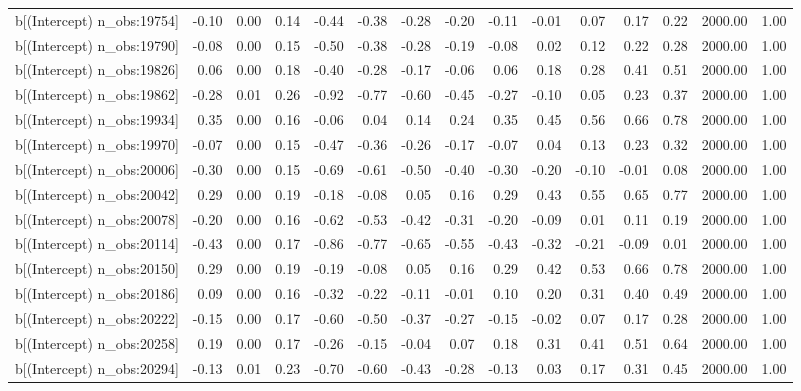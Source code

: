 \begin{table}[ht]
\begin{tabular}{rrrrrrrrrrrrrrr}
  b[(Intercept) n\_obs:19754] & -0.10 & 0.00 & 0.14 & -0.44 & -0.38 & -0.28 & -0.20 & -0.11 & -0.01 & 0.07 & 0.17 & 0.22 & 2000.00 & 1.00 \\ 
  b[(Intercept) n\_obs:19790] & -0.08 & 0.00 & 0.15 & -0.50 & -0.38 & -0.28 & -0.19 & -0.08 & 0.02 & 0.12 & 0.22 & 0.28 & 2000.00 & 1.00 \\ 
  b[(Intercept) n\_obs:19826] & 0.06 & 0.00 & 0.18 & -0.40 & -0.28 & -0.17 & -0.06 & 0.06 & 0.18 & 0.28 & 0.41 & 0.51 & 2000.00 & 1.00 \\ 
  b[(Intercept) n\_obs:19862] & -0.28 & 0.01 & 0.26 & -0.92 & -0.77 & -0.60 & -0.45 & -0.27 & -0.10 & 0.05 & 0.23 & 0.37 & 2000.00 & 1.00 \\ 
  b[(Intercept) n\_obs:19934] & 0.35 & 0.00 & 0.16 & -0.06 & 0.04 & 0.14 & 0.24 & 0.35 & 0.45 & 0.56 & 0.66 & 0.78 & 2000.00 & 1.00 \\ 
  b[(Intercept) n\_obs:19970] & -0.07 & 0.00 & 0.15 & -0.47 & -0.36 & -0.26 & -0.17 & -0.07 & 0.04 & 0.13 & 0.23 & 0.32 & 2000.00 & 1.00 \\ 
  b[(Intercept) n\_obs:20006] & -0.30 & 0.00 & 0.15 & -0.69 & -0.61 & -0.50 & -0.40 & -0.30 & -0.20 & -0.10 & -0.01 & 0.08 & 2000.00 & 1.00 \\ 
  b[(Intercept) n\_obs:20042] & 0.29 & 0.00 & 0.19 & -0.18 & -0.08 & 0.05 & 0.16 & 0.29 & 0.43 & 0.55 & 0.65 & 0.77 & 2000.00 & 1.00 \\ 
  b[(Intercept) n\_obs:20078] & -0.20 & 0.00 & 0.16 & -0.62 & -0.53 & -0.42 & -0.31 & -0.20 & -0.09 & 0.01 & 0.11 & 0.19 & 2000.00 & 1.00 \\ 
  b[(Intercept) n\_obs:20114] & -0.43 & 0.00 & 0.17 & -0.86 & -0.77 & -0.65 & -0.55 & -0.43 & -0.32 & -0.21 & -0.09 & 0.01 & 2000.00 & 1.00 \\ 
  b[(Intercept) n\_obs:20150] & 0.29 & 0.00 & 0.19 & -0.19 & -0.08 & 0.05 & 0.16 & 0.29 & 0.42 & 0.53 & 0.66 & 0.78 & 2000.00 & 1.00 \\ 
  b[(Intercept) n\_obs:20186] & 0.09 & 0.00 & 0.16 & -0.32 & -0.22 & -0.11 & -0.01 & 0.10 & 0.20 & 0.31 & 0.40 & 0.49 & 2000.00 & 1.00 \\ 
  b[(Intercept) n\_obs:20222] & -0.15 & 0.00 & 0.17 & -0.60 & -0.50 & -0.37 & -0.27 & -0.15 & -0.02 & 0.07 & 0.17 & 0.28 & 2000.00 & 1.00 \\ 
  b[(Intercept) n\_obs:20258] & 0.19 & 0.00 & 0.17 & -0.26 & -0.15 & -0.04 & 0.07 & 0.18 & 0.31 & 0.41 & 0.51 & 0.64 & 2000.00 & 1.00 \\ 
  b[(Intercept) n\_obs:20294] & -0.13 & 0.01 & 0.23 & -0.70 & -0.60 & -0.43 & -0.28 & -0.13 & 0.03 & 0.17 & 0.31 & 0.45 & 2000.00 & 1.00 \\ 

\end{tabular}
\end{table}
